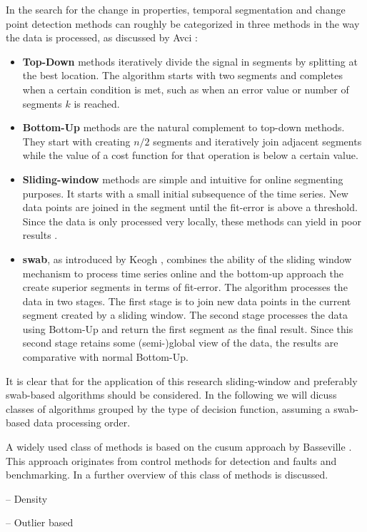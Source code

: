 In the search for the change in properties, temporal segmentation and change point detection methods can roughly be categorized in three methods in the way the data is processed, as discussed by Avci \etal \cite{avci2010activity}:
\begin{itemize}
  \item \textbf{Top-Down} methods iteratively divide the signal in segments by splitting at the best location.
  The algorithm starts with two segments and completes when a certain condition is met, such as when an error value or number of segments $k$ is reached.
  \item \textbf{Bottom-Up} methods are the natural complement to top-down methods.
  They start with creating $n/2$ segments and iteratively join adjacent segments while the value of a cost function for that operation is below a certain value.
  \item \textbf{Sliding-window} methods are simple and intuitive for online segmenting purposes.
  It starts with a small initial subsequence of the time series.
  New data points are joined in the segment until the fit-error is above a threshold.
  Since the data is only processed very locally, these methods can yield in poor results \cite{keogh2001online}.
  \item \textbf{\acrlong{swab}}, as introduced by Keogh \etal \cite{keogh2001online}, combines the ability of the sliding window mechanism to process time series online and the bottom-up approach the create superior segments in terms of fit-error.
  The algorithm processes the data in two stages.
  The first stage is to join new data points in the current segment created by a sliding window.
  The second stage processes the data using Bottom-Up and return the first segment as the final result.
  Since this second stage retains some (semi-)global view of the data, the results are comparative with normal Bottom-Up.
\end{itemize}
It is clear that for the application of this research sliding-window and preferably \gls{swab}-based algorithms should be considered.
In the following we will dicuss classes of algorithms grouped by the type of decision function, assuming a \gls{swab}-based data processing order.

A widely used class of methods is based on the \gls{cusum} approach by Basseville \etal \cite{basseville1993detection}.
This approach originates from control methods for detection and faults and benchmarking.
In  a further overview of this class of methods is discussed.




-- Density

-- Outlier based